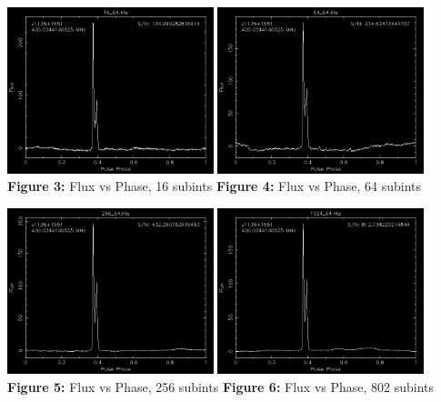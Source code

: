 \documentclass{article_saj}
\begin{document}
\begin{strip}
  \begin{center}
    \includegraphics[width=0.45\textwidth]{Plots/16_64.png}    
    \hspace{0.04\textwidth}
    \includegraphics[width=0.45\textwidth]{Plots/64_64.png}
    \textbf{Figure 3:} Flux vs Phase, 16 subints \hspace*{2.5cm} \textbf{Figure 4:} Flux vs Phase, 64 subints
  \end{center}

  \vspace{4mm}
  \begin{center}
    \includegraphics[width=0.45\textwidth]{Plots/256_64.png}
    \hspace{0.04\textwidth}
    \includegraphics[width=0.45\textwidth]{Plots/1024_64.png}  
    \textbf{Figure 5:} Flux vs Phase, 256 subints \hspace*{2.5cm} \textbf{Figure 6:} Flux vs Phase, 802 subints
  \end{center}
\end{strip}
\end{document}

